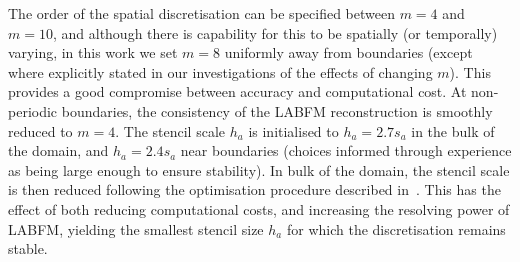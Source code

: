 \documentclass[notitlepage]{revtex4-1}
\begin{document}
The order of the spatial discretisation can be specified between $m=4$ and $m=10$, and although there is capability for this to be spatially (or temporally) varying, in this work we set $m=8$ uniformly away from boundaries (except where explicitly stated in our investigations of the effects of changing $m$). This provides a good compromise between accuracy and computational cost. At non-periodic boundaries, the consistency of the LABFM reconstruction is smoothly reduced to $m=4$. The stencil scale $h_{a}$ is initialised to $h_{a}=2.7s_{a}$ in the bulk of the domain, and $h_{a}=2.4s_{a}$ near boundaries (choices informed through experience as being large enough to ensure stability). In bulk of the domain, the stencil scale is then reduced following the optimisation procedure described in~\cite{king_2022}. This has the effect of both reducing computational costs, and increasing the resolving power of LABFM, yielding the smallest stencil size $h_{a}$ for which the discretisation remains stable.
\end{document}
